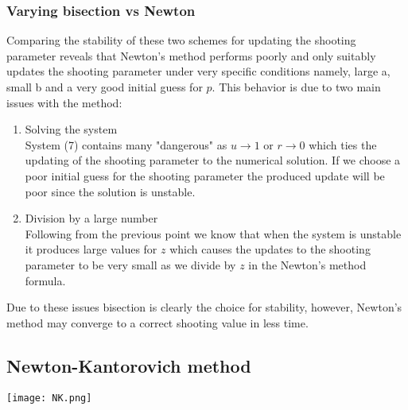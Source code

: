 \documentclass{article}
\begin{document}
\subsubsection{Varying bisection vs Newton}
Comparing the stability of these two schemes for updating the shooting parameter reveals that Newton's method performs poorly and only suitably updates the shooting parameter under very specific conditions namely, large a, small b and a very good initial guess for $p$. This behavior is due to two main issues with the method:
\begin{enumerate}
\item Solving the system \\
System (7) contains many "dangerous" as $u\rightarrow 1$ or $r\rightarrow 0$ which ties the updating of the shooting parameter to the numerical solution. If we choose a poor initial guess for the shooting parameter the produced update will be poor since the solution is unstable. 
\item Division by a large number \\
Following from the previous point we know that when the system is unstable it produces large values for $z$ which causes the updates to the shooting parameter to be very small as we divide by $z$ in the Newton's method formula.
\end{enumerate} 
Due to these issues bisection is clearly the choice for stability, however, Newton's method may converge to a correct shooting value in less time. 

\subsection{Newton-Kantorovich method}
\texttt{[image: NK.png]}
\end{document}
